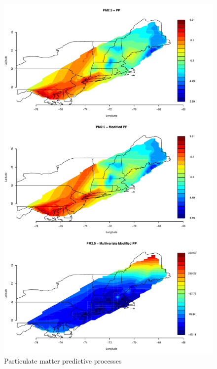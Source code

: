\documentclass[12pt]{article}
\begin{document}
\begin{figure}[ht]
\begin{center}
\includegraphics[scale=0.5]{figs/pm25_pp.pdf}
\end{center}
\caption{Particulate matter predictive processes}
\end{figure}
\end{document}
